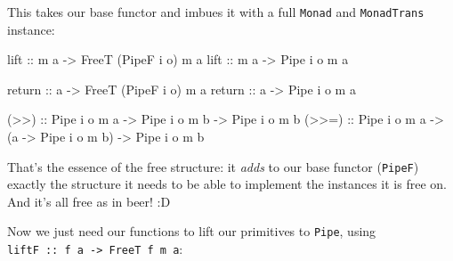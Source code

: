 \documentclass[]{article}
\newenvironment{Shaded}{}{}
\newcommand{\CommentTok}[1]{\textcolor[rgb]{0.38,0.63,0.69}{\textit{#1}}}
\newcommand{\DataTypeTok}[1]{\textcolor[rgb]{0.56,0.13,0.00}{#1}}
\newcommand{\FunctionTok}[1]{\textcolor[rgb]{0.02,0.16,0.49}{#1}}
\newcommand{\NormalTok}[1]{#1}
\newcommand{\OperatorTok}[1]{\textcolor[rgb]{0.40,0.40,0.40}{#1}}
\newcommand{\OtherTok}[1]{\textcolor[rgb]{0.00,0.44,0.13}{#1}}
\begin{document}
This takes our base functor and imbues it with a full \texttt{Monad} and
\texttt{MonadTrans} instance:

\begin{Shaded}
\begin{Highlighting}[]
\OtherTok{lift ::}\NormalTok{ m a }\OtherTok{{-}>} \DataTypeTok{FreeT}\NormalTok{ (}\DataTypeTok{PipeF}\NormalTok{ i o) m a}
\OtherTok{lift ::}\NormalTok{ m a }\OtherTok{{-}>} \DataTypeTok{Pipe}\NormalTok{ i o m a}

\FunctionTok{return}\OtherTok{ ::}\NormalTok{ a }\OtherTok{{-}>} \DataTypeTok{FreeT}\NormalTok{ (}\DataTypeTok{PipeF}\NormalTok{ i o) m a}
\FunctionTok{return}\OtherTok{ ::}\NormalTok{ a }\OtherTok{{-}>} \DataTypeTok{Pipe}\NormalTok{ i o m a}

\OtherTok{(>>)  ::} \DataTypeTok{Pipe}\NormalTok{ i o m a }\OtherTok{{-}>} \DataTypeTok{Pipe}\NormalTok{ i o m b }\OtherTok{{-}>} \DataTypeTok{Pipe}\NormalTok{ i o m b}
\OtherTok{(>>=) ::} \DataTypeTok{Pipe}\NormalTok{ i o m a }\OtherTok{{-}>}\NormalTok{ (a }\OtherTok{{-}>} \DataTypeTok{Pipe}\NormalTok{ i o m b) }\OtherTok{{-}>} \DataTypeTok{Pipe}\NormalTok{ i o m b}
\end{Highlighting}
\end{Shaded}

That's the essence of the free structure: it \emph{adds} to our base functor
(\texttt{PipeF}) exactly the structure it needs to be able to implement the
instances it is free on. And it's all free as in beer! :D

Now we just need our functions to lift our primitives to \texttt{Pipe}, using
\texttt{liftF\ ::\ f\ a\ -\textgreater{}\ FreeT\ f\ m\ a}:

\begin{Shaded}
\end{Shaded}
\end{document}
